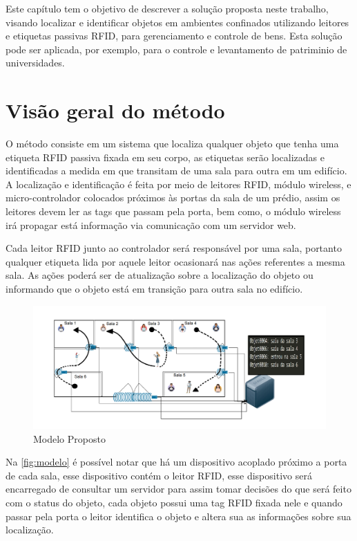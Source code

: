 \label{chapter:metodo}

Este capítulo tem o objetivo de descrever a solução proposta neste trabalho, visando localizar e identificar objetos
em ambientes confinados utilizando leitores e etiquetas passivas RFID, para gerenciamento e controle de bens.
%
Esta solução pode ser aplicada, por exemplo, para o controle e levantamento de patriminio de universidades.

%
%
\section{Visão geral do método}

O método consiste em um sistema que localiza qualquer objeto que tenha uma etiqueta RFID passiva fixada em seu corpo,
as etiquetas serão localizadas e identificadas a medida em que transitam de uma sala para outra em um edifício.
%
A localização e identificação é feita por meio de leitores RFID, módulo wireless, e micro-controlador colocados próximos às portas da sala
de um prédio, assim os leitores devem ler as tags que passam pela porta, bem como, o módulo wireless irá propagar está informação via
comunicação com um servidor web.


Cada leitor RFID junto ao controlador será responsável por uma sala, portanto qualquer etiqueta lida por aquele leitor
ocasionará nas ações referentes a mesma sala. As ações poderá ser de atualização sobre a localização do objeto ou informando
que o objeto está em transição para outra sala no edifício.
\begin{figure}[H]
              \caption{\label{fig:modelo}{Modelo Proposto}}
              \centering
              \includegraphics[width=1.1\textwidth]{Figuras/bigpicture.png}
        \end{figure}

\par
Na \autoref{fig:modelo} é possível notar que há um dispositivo acoplado próximo a
porta de cada sala, esse dispositivo contém o leitor RFID, esse dispositivo será encarregado de consultar um
servidor para assim tomar decisões do que será feito com o status do objeto, cada objeto possui uma tag RFID fixada
nele e quando passar pela porta o leitor identifica o objeto e altera sua as informações sobre sua localização.

